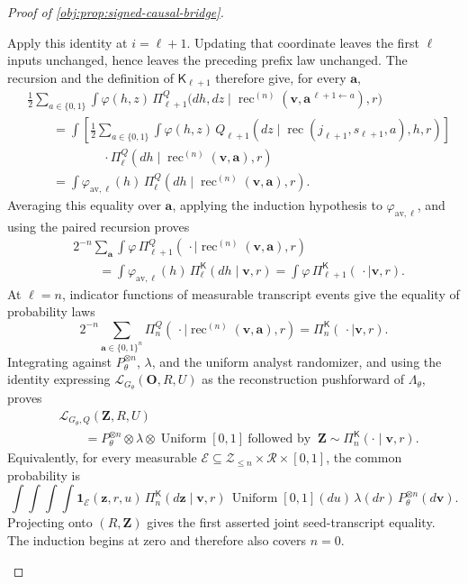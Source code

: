 \documentclass[11pt]{article}
\begin{document}
\begin{proof}[Proof of \cref{obj:prop:signed-causal-bridge}]
\begin{enumerate}
Apply this identity at \(i=\ell+1\). Updating that coordinate leaves the
first \(\ell\) inputs unchanged, hence leaves the preceding prefix law
unchanged. The recursion and the definition of \(\mathsf K_{\ell+1}\)
therefore give, for every \(\mathbf a\),
\[
\begin{aligned}
&\frac12\sum_{a\in\{0,1\}}
 \int\varphi(h,z)\,
 \Pi_{\ell+1}^Q
 \bigl(dh,dz\mid
 \operatorname{rec}^{(n)}
   (\mathbf v,\mathbf a^{\,\ell+1\leftarrow a}),r\bigr)\\
&\qquad=
 \int\left[
 \frac12\sum_{a\in\{0,1\}}
 \int\varphi(h,z)\,
 Q_{\ell+1}(dz\mid
 \operatorname{rec}(j_{\ell+1},s_{\ell+1},a),h,r)
 \right]\\
&\hspace{6em}\cdot
 \Pi_\ell^Q(dh\mid
 \operatorname{rec}^{(n)}(\mathbf v,\mathbf a),r)\\
&\qquad=
 \int\varphi_{\mathrm{av},\ell}(h)\,
 \Pi_\ell^Q(dh\mid
 \operatorname{rec}^{(n)}(\mathbf v,\mathbf a),r).
\end{aligned}
\]
Averaging this equality over \(\mathbf a\), applying the induction
hypothesis to \(\varphi_{\mathrm{av},\ell}\), and using the paired
recursion proves
\[
\begin{aligned}
&2^{-n}\sum_{\mathbf a}
 \int\varphi\,
 \Pi_{\ell+1}^Q
 (\,\cdot\mid\operatorname{rec}^{(n)}(\mathbf v,\mathbf a),r)\\
&\qquad=
 \int\varphi_{\mathrm{av},\ell}(h)\,
 \Pi_\ell^{\mathsf K}(dh\mid\mathbf v,r)
 =\int\varphi\,\Pi_{\ell+1}^{\mathsf K}
 (\,\cdot\mid\mathbf v,r).
\end{aligned}
\]
At \(\ell=n\), indicator functions of measurable transcript events give
the equality of probability laws
\[
2^{-n}\sum_{\mathbf a\in\{0,1\}^n}
\Pi_n^Q
(\,\cdot\mid\operatorname{rec}^{(n)}(\mathbf v,\mathbf a),r)
=\Pi_n^{\mathsf K}(\,\cdot\mid\mathbf v,r).
\]
Integrating against \(P_\theta^{\otimes n}\), \(\lambda\), and the uniform
analyst randomizer, and using the identity expressing
\(\mathcal L_{G_\theta}(\mathbf O,R,U)\) as the reconstruction
pushforward of \(\Lambda_\theta\), proves
\[
\begin{aligned}
&\mathcal L_{G_\theta,Q}(\mathbf Z,R,U)\\
&\qquad=
P_\theta^{\otimes n}\otimes\lambda
 \otimes\operatorname{Uniform}[0,1]
\ \text{followed by }\ 
\mathbf Z\sim\Pi_n^{\mathsf K}(\cdot\mid\mathbf v,r).
\end{aligned}
\]
Equivalently, for every measurable
\(\mathcal E\subseteq\mathcal Z_{\le n}\times\mathcal R\times[0,1]\),
the common probability is
\[
\int\!\int\!\int\!\int
\mathbf1_{\mathcal E}(\mathbf z,r,u)\,
\Pi_n^{\mathsf K}(d\mathbf z\mid\mathbf v,r)\,
\operatorname{Uniform}[0,1](du)\,
\lambda(dr)\,P_\theta^{\otimes n}(d\mathbf v).
\]
Projecting onto \((R,\mathbf Z)\) gives the first asserted joint
seed-transcript equality. The induction begins at zero and therefore
also covers \(n=0\).


\end{enumerate}
\end{proof}
\end{document}
